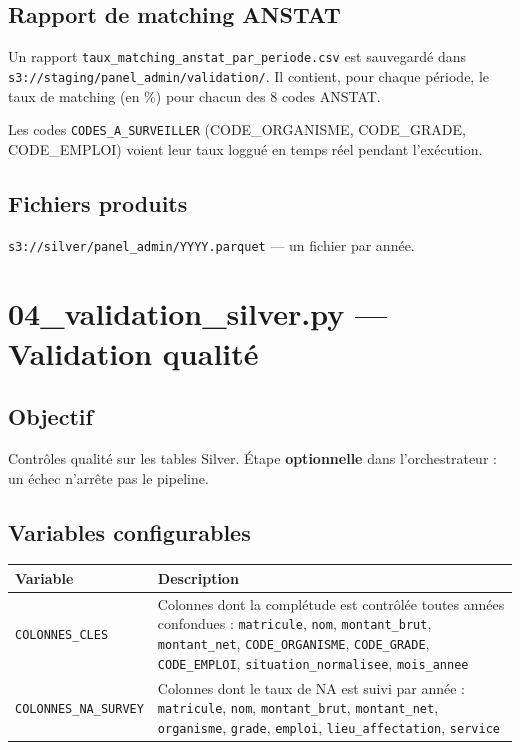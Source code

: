 \documentclass[12pt,a4paper,french]{report}
\newcommand{\bucket}[1]{\texttt{s3://#1}}
\begin{document}
\subsection{Rapport de matching ANSTAT}

Un rapport \texttt{taux\_matching\_anstat\_par\_periode.csv} est sauvegardé
dans \bucket{staging/panel\_admin/validation/}. Il contient, pour chaque
période, le taux de matching (en \%) pour chacun des 8 codes ANSTAT.

Les codes \texttt{CODES\_A\_SURVEILLER} (CODE\_ORGANISME, CODE\_GRADE,
CODE\_EMPLOI) voient leur taux loggué en temps réel pendant l'exécution.

\subsection{Fichiers produits}

\bucket{silver/panel\_admin/YYYY.parquet} --- un fichier par année.

\section{04\_validation\_silver.py — Validation qualité}

\subsection{Objectif}

Contrôles qualité sur les tables Silver. Étape \textbf{optionnelle} dans
l'orchestrateur : un échec n'arrête pas le pipeline.

\subsection{Variables configurables}

\begin{tabularx}{\textwidth}{lX}
  \toprule
  \textbf{Variable} & \textbf{Description} \\
  \midrule
  \texttt{COLONNES\_CLES} &
    Colonnes dont la complétude est contrôlée toutes années confondues :
    \texttt{matricule}, \texttt{nom}, \texttt{montant\_brut},
    \texttt{montant\_net}, \texttt{CODE\_ORGANISME}, \texttt{CODE\_GRADE},
    \texttt{CODE\_EMPLOI}, \texttt{situation\_normalisee},
    \texttt{mois\_annee} \\
  \texttt{COLONNES\_NA\_SURVEY} &
    Colonnes dont le taux de NA est suivi par année :
    \texttt{matricule}, \texttt{nom}, \texttt{montant\_brut},
    \texttt{montant\_net}, \texttt{organisme}, \texttt{grade},
    \texttt{emploi}, \texttt{lieu\_affectation}, \texttt{service} \\
  \bottomrule
\end{tabularx}
\end{document}
